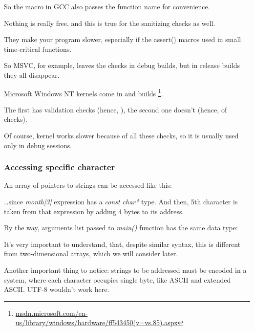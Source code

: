 So the macro in GCC also passes the function name for convenience.

Nothing is really free, and this is true for the sanitizing checks as well.

They make your program slower, especially if the assert() macros used in small time-critical functions.

So MSVC, for example, leaves the checks in debug builds, but in release builds they all disappear.
 
Microsoft \gls{Windows NT} kernels come in  and  builds
\footnote{\href{http://go.yurichev.com/17259}{msdn.microsoft.com/en-us/library/windows/hardware/ff543450(v=vs.85).aspx}}.

The first has validation checks (hence, ), the second one doesn't (hence,  of checks).

Of course,  kernel works slower because of all these checks, so it is usually used only in debug sessions.


\subsubsection{Accessing specific character}

An array of pointers to strings can be accessed like this:



\dots since \emph{month[3]} expression has a \emph{const char*} type.
And then, 5th character is taken from that expression by adding 4 bytes to its address.

By the way, arguments list passed to \emph{main()} function has the same data type:



It's very important to understand, that, despite similar syntax,
this is different from two-dimensional arrays, which we will consider later.

Another important thing to notice: strings to be addressed must be encoded in a system, where each character occupies single
byte, like \ac{ASCII} and extended \ac{ASCII}.
UTF-8 wouldn't work here.

